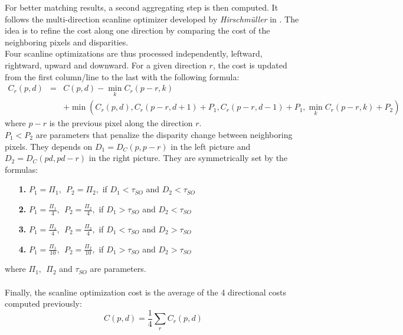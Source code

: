 \documentclass{article}
\begin{document}
For better matching results, a second aggregating step is then computed. It follows the multi-direction scanline optimizer developed by \textit{Hirschmüller} in \cite{scanlineOptim}. The idea is to refine the cost along one direction by comparing the cost of the neighboring pixels and disparities.\\
Four scanline optimizations are thus processed independently, leftward, rightward, upward and downward. For a given direction $r$, the cost is updated from the first column/line to the last with the following formula:
\begin{eqnarray*}
	C_r (p, d) &=&
	 C(p, d) - \min_k C_r(p-r, k)\\
	 && + \min\left( C_r(p, d) , C_r(p-r, d+1) + P_1, C_r(p-r, d-1) + P_1, \min_k C_r(p-r, k) + P_2\right)
\end{eqnarray*}
where $p-r$ is the previous pixel along the direction $r$.\\
$P_1 < P_2$ are parameters that penalize the disparity change between neighboring pixels. They depends on $D_1 = D_C(p, p-r)$ in the left picture and $D_2 = D_C(pd, pd-r)$ in the right picture. They are symmetrically set by the formulas:
\begin{itemize}
	\item[\textbf{1. }]$P_1 = \Pi_1, \ \ P_2 = \Pi_2,$ if $D_1 < \tau_{SO}$ and $D_2 < \tau_{SO}$
	\item[\textbf{2. }]$P_1 = \frac{\Pi_1}{4}, \ \ P_2 =\frac{\Pi_2}{4},$ if $D_1 > \tau_{SO}$ and $D_2 < \tau_{SO}$
	\item[\textbf{3. }]$P_1 = \frac{\Pi_1}{4}, \ \ P_2 =\frac{\Pi_2}{4},$ if $D_1 < \tau_{SO}$ and $D_2 > \tau_{SO}$
	\item[\textbf{4. }]$P_1 = \frac{\Pi_1}{10}, \ \ P_2 =\frac{\Pi_2}{10},$ if $D_1 > \tau_{SO}$ and $D_2 > \tau_{SO}$
\end{itemize}
where $\Pi_1, \ \ \Pi_2 $ and $\tau_{SO}$ are parameters.\\
\\
Finally, the scanline optimization cost is the average of the 4 directional costs computed previously:
\[
	C(p, d) = \frac{1}{4} \sum_r C_r(p,d)
\]
\end{document}
